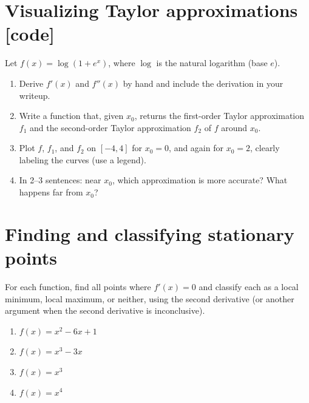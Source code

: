 \documentclass[letterpaper]{article}
\newcommand{\Real}{\mathbb{R}}
\newcommand{\opt}{^\star}
\begin{document}
\section{Visualizing Taylor approximations \textbf{[code]}}
Let $f(x) = \log(1 + e^{x})$, where $\log$ is the natural logarithm (base $e$).
\begin{enumerate}
\item Derive $f'(x)$ and $f''(x)$ by hand and include the derivation in your writeup.
\item Write a function that, given $x_0$, returns the first-order Taylor approximation $f_1$ and the second-order Taylor approximation $f_2$ of $f$ around $x_0$.
\item Plot $f$, $f_1$, and $f_2$ on $[-4, 4]$ for $x_0 = 0$, and again for $x_0 = 2$, clearly labeling the curves (use a legend).
\item In 2--3 sentences: near $x_0$, which approximation is more accurate? What happens far from $x_0$?
\end{enumerate}

\section{Finding and classifying stationary points}
For each function, find all points where $f'(x) = 0$ and classify each as a local minimum, local maximum, or neither, using the second derivative (or another argument when the second derivative is inconclusive).
\begin{enumerate}
\item $f(x) = x^2 - 6x + 1$
\item $f(x) = x^3 - 3x$
\item $f(x) = x^3$
\item $f(x) = x^4$
\end{enumerate}

\end{document}
